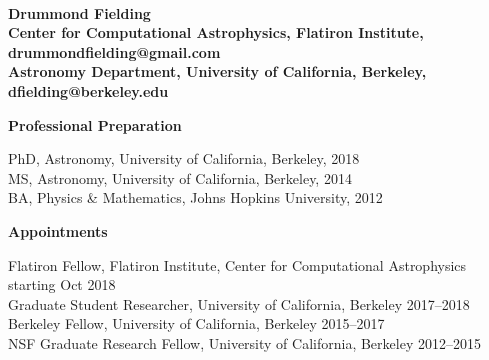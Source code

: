 \documentclass[11pt,letterpaper,english]{article}
\begin{document}
\setlength{\parindent}{0in} %

\pagestyle{fancy}   \renewcommand{%
\headrulewidth}{0.0pt}



\\
{\bf Drummond Fielding}\\
{\bf Center for Computational Astrophysics, Flatiron Institute, drummondfielding@gmail.com} \\
{\bf Astronomy Department, University of California, Berkeley, dfielding@berkeley.edu} \smallskip

\begin{flushleft} {\bf Professional Preparation}
{\parindent 16pt

PhD, Astronomy, University of California, Berkeley, 2018 \\ 
MS, Astronomy, University of California, Berkeley, 2014 \\ 
BA, Physics \& Mathematics, Johns Hopkins University, 2012 \\ 
}

\vspace{.04in}
{\bf Appointments}
{\parindent 16pt

Flatiron Fellow, Flatiron Institute, Center for Computational Astrophysics \hfill starting Oct 2018\\ 
Graduate Student Researcher, University of California, Berkeley \hfill  2017--2018  \\
Berkeley Fellow, University of California, Berkeley     \hfill  2015--2017 \\ 
NSF Graduate Research Fellow, University of California, Berkeley  \hfill  2012--2015 \\
}


\end{flushleft}
\end{document}
